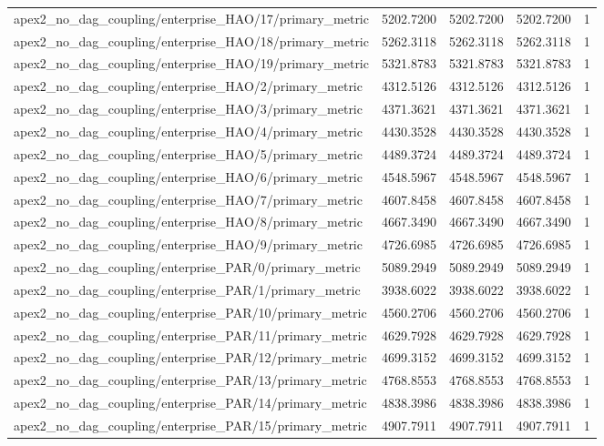 \begin{table}[h]
\begin{tabular}{lrrrr}
apex2_no_dag_coupling/enterprise_HAO/17/primary_metric & 5202.7200 & 5202.7200 & 5202.7200 & 1 \\
apex2_no_dag_coupling/enterprise_HAO/18/primary_metric & 5262.3118 & 5262.3118 & 5262.3118 & 1 \\
apex2_no_dag_coupling/enterprise_HAO/19/primary_metric & 5321.8783 & 5321.8783 & 5321.8783 & 1 \\
apex2_no_dag_coupling/enterprise_HAO/2/primary_metric & 4312.5126 & 4312.5126 & 4312.5126 & 1 \\
apex2_no_dag_coupling/enterprise_HAO/3/primary_metric & 4371.3621 & 4371.3621 & 4371.3621 & 1 \\
apex2_no_dag_coupling/enterprise_HAO/4/primary_metric & 4430.3528 & 4430.3528 & 4430.3528 & 1 \\
apex2_no_dag_coupling/enterprise_HAO/5/primary_metric & 4489.3724 & 4489.3724 & 4489.3724 & 1 \\
apex2_no_dag_coupling/enterprise_HAO/6/primary_metric & 4548.5967 & 4548.5967 & 4548.5967 & 1 \\
apex2_no_dag_coupling/enterprise_HAO/7/primary_metric & 4607.8458 & 4607.8458 & 4607.8458 & 1 \\
apex2_no_dag_coupling/enterprise_HAO/8/primary_metric & 4667.3490 & 4667.3490 & 4667.3490 & 1 \\
apex2_no_dag_coupling/enterprise_HAO/9/primary_metric & 4726.6985 & 4726.6985 & 4726.6985 & 1 \\
apex2_no_dag_coupling/enterprise_PAR/0/primary_metric & 5089.2949 & 5089.2949 & 5089.2949 & 1 \\
apex2_no_dag_coupling/enterprise_PAR/1/primary_metric & 3938.6022 & 3938.6022 & 3938.6022 & 1 \\
apex2_no_dag_coupling/enterprise_PAR/10/primary_metric & 4560.2706 & 4560.2706 & 4560.2706 & 1 \\
apex2_no_dag_coupling/enterprise_PAR/11/primary_metric & 4629.7928 & 4629.7928 & 4629.7928 & 1 \\
apex2_no_dag_coupling/enterprise_PAR/12/primary_metric & 4699.3152 & 4699.3152 & 4699.3152 & 1 \\
apex2_no_dag_coupling/enterprise_PAR/13/primary_metric & 4768.8553 & 4768.8553 & 4768.8553 & 1 \\
apex2_no_dag_coupling/enterprise_PAR/14/primary_metric & 4838.3986 & 4838.3986 & 4838.3986 & 1 \\
apex2_no_dag_coupling/enterprise_PAR/15/primary_metric & 4907.7911 & 4907.7911 & 4907.7911 & 1 \\

\end{tabular}
\end{table}

